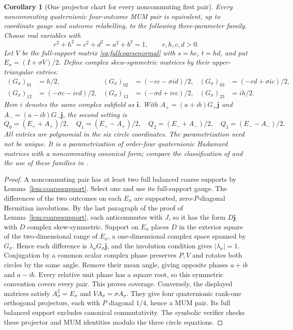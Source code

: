 \documentclass[11pt]{article}
\newtheorem{corollary}[theorem]{Corollary}
\begin{document}
\begin{corollary}[One projector chart for every noncommuting first pair]
\label{cor:unifiedpairchart}
Every noncommuting quaternionic four-outcome MUM pair is equivalent,
up to coordinate gauge and outcome relabelling, to the following
three-parameter family. Choose real variables with
\[
 r^2+h^2=c^2+d^2=a^2+b^2=1,\qquad r,h,c,d>0.
\]
Let $V$ be the full-support matrix \eqref{eq:fullcoarsenormal} with
$s=hc$, $t=hd$, and put $E_\sigma=(I+\sigma V)/2$. Define complex
skew-symmetric matrices by their upper-triangular entries:
\[
\begin{aligned}
 (G_\sigma)_{01}&=h/2,&
 (G_\sigma)_{02}&=(-rc-\sigma i d)/2,&
 (G_\sigma)_{03}&=(-rd+\sigma i c)/2,\\
 (G_\sigma)_{12}&=(-\sigma c-i rd)/2,&
 (G_\sigma)_{13}&=(-\sigma d+i rc)/2,&
 (G_\sigma)_{23}&=i h/2.
\end{aligned}
\]
Here $i$ denotes the same complex subfield as $\mathbf i$.
With $A_+=(a+i b)G_+\mathbf j$ and
$A_-=(a-i b)G_-\mathbf j$, the second
setting is
\[
 Q_0=(E_++A_+)/2,\quad Q_1=(E_+-A_+)/2,\quad
 Q_2=(E_-+A_-)/2,\quad Q_3=(E_--A_-)/2.
\]
All entries are polynomial in the six circle coordinates. The
parametrization need not be unique. It is a parametrization of order-four
quaternionic Hadamard matrices with a noncommuting canonical form;
compare the classification of \cite[Thm.~4.6]{CD} and the use of these
families in \cite[Sec.~2.5]{FKN}.
\end{corollary}
\begin{proof}
A noncommuting pair has at least two full balanced coarse supports by
Lemma~\ref{lem:coarsesupport}. Select one and use its full-support gauge.
The differences of the two outcomes on each $E_\sigma$ are supported,
zero-$P$-diagonal Hermitian involutions. By the last paragraph of the
proof of Lemma~\ref{lem:coarsesupport}, each anticommutes with $J$, so it
has the form $D\mathbf j$ with $D$ complex skew-symmetric. Support on
$E_\sigma$ places $D$ in the exterior square of the two-dimensional range
of $E_\sigma$, a one-dimensional complex space spanned by $G_\sigma$.
Hence each difference is $\lambda_\sigma G_\sigma\mathbf j$, and the
involution condition gives $|\lambda_\sigma|=1$.
Conjugation by a common scalar complex phase preserves $P,V$ and rotates
both circles by the same angle. Remove their mean angle, giving opposite
phases $a+i b$ and $a-i b$. Every relative unit phase has a square root,
so this symmetric convention covers every pair. This proves coverage.
Conversely, the displayed matrices satisfy $A_\sigma^2=E_\sigma$ and
$VA_\sigma=\sigma A_\sigma$. They give four quaternionic rank-one
orthogonal projectors, each with $P$ diagonal $1/4$, hence a MUM pair.
Its full balanced support excludes canonical commutativity.
The symbolic verifier checks these projector and MUM identities modulo
the three circle equations.
\end{proof}
\end{document}

